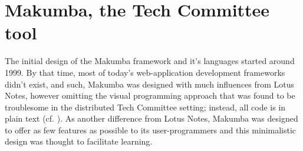\documentclass{llncs}
\begin{document}

\section{Makumba, the Tech Committee tool}\label{sec:makumba}

The initial design of the Makumba framework and it's languages started around 1999. By that time, most of today's web-application development frameworks didn't exist, and such, Makumba was designed with much influences from Lotus Notes, however omitting the visual programming approach that was found to be troublesome in the distributed Tech Committee setting; instead, all code is in plain text (cf. \cite{yamauchi00}). As another difference from Lotus Notes, Makumba was designed to offer as few features as possible to its user-programmers and this minimalistic design was thought to facilitate learning. 
\end{document}
